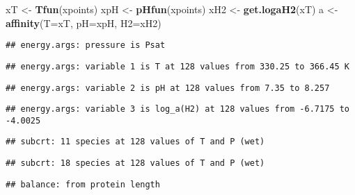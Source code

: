 \documentclass[]{article}
\newenvironment{Shaded}{\begin{snugshade}}{\end{snugshade}}
\newcommand{\KeywordTok}[1]{\textcolor[rgb]{0.13,0.29,0.53}{\textbf{#1}}}
\newcommand{\DataTypeTok}[1]{\textcolor[rgb]{0.13,0.29,0.53}{#1}}
\newcommand{\DecValTok}[1]{\textcolor[rgb]{0.00,0.00,0.81}{#1}}
\newcommand{\StringTok}[1]{\textcolor[rgb]{0.31,0.60,0.02}{#1}}
\newcommand{\OtherTok}[1]{\textcolor[rgb]{0.56,0.35,0.01}{#1}}
\newcommand{\OperatorTok}[1]{\textcolor[rgb]{0.81,0.36,0.00}{\textbf{#1}}}
\newcommand{\NormalTok}[1]{#1}
\begin{document}
\begin{Shaded}
\begin{Highlighting}[]
\NormalTok{xT <-}\StringTok{ }\KeywordTok{Tfun}\NormalTok{(xpoints)}
\NormalTok{xpH <-}\StringTok{ }\KeywordTok{pHfun}\NormalTok{(xpoints)}
\NormalTok{xH2 <-}\StringTok{ }\KeywordTok{get.logaH2}\NormalTok{(xT)}
\NormalTok{a <-}\StringTok{ }\KeywordTok{affinity}\NormalTok{(}\DataTypeTok{T=}\NormalTok{xT, }\DataTypeTok{pH=}\NormalTok{xpH, }\DataTypeTok{H2=}\NormalTok{xH2)}
\end{Highlighting}
\end{Shaded}

\begin{verbatim}
## energy.args: pressure is Psat
\end{verbatim}

\begin{verbatim}
## energy.args: variable 1 is T at 128 values from 330.25 to 366.45 K
\end{verbatim}

\begin{verbatim}
## energy.args: variable 2 is pH at 128 values from 7.35 to 8.257
\end{verbatim}

\begin{verbatim}
## energy.args: variable 3 is log_a(H2) at 128 values from -6.7175 to -4.0025
\end{verbatim}

\begin{verbatim}
## subcrt: 11 species at 128 values of T and P (wet)
\end{verbatim}

\begin{verbatim}
## subcrt: 18 species at 128 values of T and P (wet)
\end{verbatim}

\begin{Shaded}
\end{Shaded}

\begin{verbatim}
## balance: from protein length
\end{verbatim}
\end{document}
